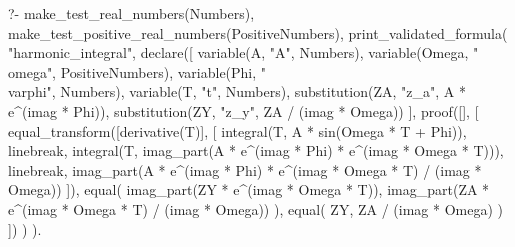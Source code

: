 \begin{prolog}
?-	make_test_real_numbers(Numbers),
	make_test_positive_real_numbers(PositiveNumbers),
	print_validated_formula(
		"harmonic_integral",
		declare([
			variable(A, "A", Numbers),
			variable(Omega, "\\omega", PositiveNumbers),
			variable(Phi, "\\varphi", Numbers),
			variable(T, "t", Numbers),
			substitution(ZA, "z_a", A * e^(imag * Phi)),
			substitution(ZY, "z_y", ZA / (imag * Omega))
		],
			proof([],
			[
				equal_transform([derivative(T)], [
					integral(T, A * sin(Omega * T + Phi)),
					linebreak,
					integral(T, imag_part(A * e^(imag * Phi) * e^(imag * Omega * T))),
					linebreak,
					imag_part(A * e^(imag * Phi) * e^(imag * Omega * T) / (imag * Omega))
				]),
				equal(
					imag_part(ZY * e^(imag * Omega * T)),
					imag_part(ZA * e^(imag * Omega * T) / (imag * Omega))
				),
				equal(
					ZY,
					ZA / (imag * Omega)
				)
			])
		)
	).
\end{prolog}
